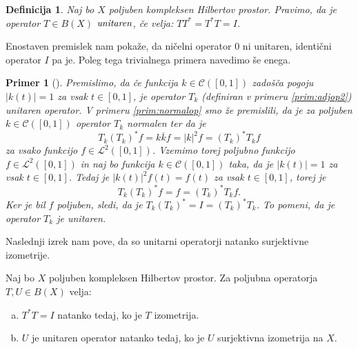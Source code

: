 \documentclass[12pt,a4paper,oneside,fleqn,openany]{book}
\newtheorem{definicija}[izrek]{Definicija}
\newtheorem{primer*}[izrek]{Primer}
\newenvironment{primer}[1][]{\begin{primer*}[#1]\renewcommand*{\qedsymbol}{$\diamondsuit$}\pushQED{\qed}}{\popQED\end{primer*}}
\newcommand{\abs}[1]{\ensuremath{\lvert #1 \rvert}}
\newcommand{\pojem}[1]{\ensuremath{\emph{#1}}}
\begin{document}
\begin{definicija}
	\label{def:unitarop}
	Naj bo $X$ poljuben kompleksen Hilbertov prostor. Pravimo, da je operator $T\in B(X)$ \pojem{unitaren}, če velja: $TT^* = T^*T = I$.
\end{definicija}
Enostaven premislek nam pokaže, da ničelni operator $0$ ni unitaren, identični operator $I$ pa je. Poleg tega trivialnega primera navedimo še enega.
\begin{primer}
	\label{prim:unitarop}
	Premislimo, da če funkcija $k\in\mathcal{C}([0, 1])$ zadošča pogoju $\abs{k(t)} = 1$ za vsak $t\in [0, 1]$, je operator $T_k$ (definiran v primeru \ref{prim:adjop2}) unitaren operator.
	V primeru \ref{prim:normalop} smo že premislili, da je za poljuben $k\in\mathcal{C}([0, 1])$ operator $T_k$ normalen ter da je $$T_k(T_k)^*f = k\overline{k}f =\abs{k}^2f= (T_k)^*T_kf$$ za vsako funkcijo $f\in\mathcal{L}^2([0, 1])$. Vzemimo torej poljubno funkcijo $f\in\mathcal{L}^2([0, 1])$ in naj bo funkcija $k\in\mathcal{C}([0, 1])$ taka, da je $\abs{k(t)}=1$ za vsak $t\in[0, 1]$. Tedaj je $\abs{k(t)}^2f(t) = f(t)$ za vsak $t\in[0, 1]$, torej je $$T_k(T_k)^*f = f = (T_k)^*T_kf.$$ Ker je bil $f$ poljuben, sledi, da je $T_k(T_k)^* = I = (T_k)^*T_k$. To pomeni, da je operator $T_k$ je unitaren.
\end{primer}

Naslednji izrek nam pove, da so unitarni operatorji natanko surjektivne izometrije.

\begin{izrek}
	\label{izr:uniizo}
	Naj bo $X$ poljuben kompleksen Hilbertov prostor. Za poljubna operatorja $T, U\in B(X)$ velja: \begin{enumerate}[a)]
		\item $T^*T = I$ natanko tedaj, ko je $T$ izometrija.
		\item $U$ je unitaren operator natanko tedaj, ko je $U$ surjektivna izometrija na $X$.
	\end{enumerate}
\end{izrek}
\end{document}
